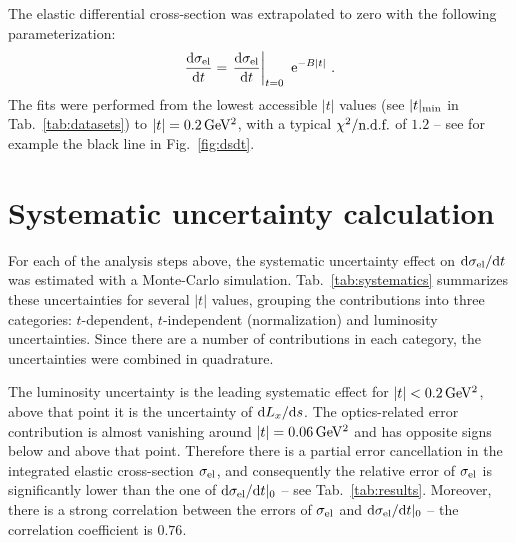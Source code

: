 \documentclass[doublecol]{../macros/epl2}
\def\d{{\rm d}}
\def\un#1{\,{\rm #1}}
\def\e{{\rm e}}
\begin{document}
The elastic differential cross-section was extrapolated to zero with the following parameterization:
\begin{equation}
\label{eq:extrapolation}
{\d\sigma_{\rm el}\over \d t} = \left. {\d\sigma_{\rm el}\over \d t}\right|_{t=0} \ \e^{-B|t|}\ .
\end{equation}
The fits were performed from the lowest accessible $|t|$ values (see $|t|_{\rm min}$ in Tab.~\ref{tab:datasets}) to $|t| = 0.2\un{GeV^2}$, with a typical $\chi^2/\hbox{n.d.f.}$ of $1.2$ -- see for example the black line in Fig.~\ref{fig:dsdt}.

\section{Systematic uncertainty calculation}


For each of the analysis steps above, the systematic uncertainty effect on $\d\sigma_{\rm el}/\d t$ was estimated with a Monte-Carlo simulation. Tab.~\ref{tab:systematics} summarizes these uncertainties for several $|t|$ values, grouping the contributions into three categories: $t$-dependent, $t$-independent (normalization) and luminosity uncertainties. Since there are a number of contributions in each category, the uncertainties were combined in quadrature.

The luminosity uncertainty is the leading systematic effect for $|t| < 0.2\un{GeV^2}$, above that point it is the uncertainty of $\d L_x/\d s$. The optics-related error contribution is almost vanishing around $|t| = 0.06\un{GeV^2}$ and has opposite signs below and above that point. Therefore there is a partial error cancellation in the integrated elastic cross-section $\sigma_{\rm el}$, and consequently the relative error of $\sigma_{\rm el}$ is significantly lower than the one of $\d\sigma_{\rm el}/\d t|_0$ -- see Tab.~\ref{tab:results}. Moreover, there is a strong correlation between the errors of $\sigma_{\rm el}$ and $\d\sigma_{\rm el}/\d t|_0$ -- the correlation coefficient is $0.76$.
\end{document}
